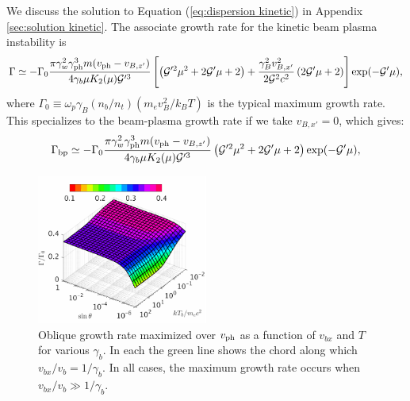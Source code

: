 \documentclass[usenatbib,iop,apj]{emulateapj}
\def\gph{\gamma_{\rm ph}}
\def\vph{v_{\rm ph}}
\def\cG{\mathcal{G}}
\begin{document}
We discuss the solution to Equation (\ref{eq:dispersion kinetic}) in Appendix \ref{sec:solution kinetic}.  The associate growth rate for the kinetic beam plasma instability is  
\begin{equation}
\Gamma \simeq - \Gamma_0
\frac{\pi \gamma_w^2 \gph^3 m (\vph-v_{B,z'})}{4 \gamma_b \mu K_2(\mu) \cG'^3}
\left[
\left( \cG'^2\mu^2 + 2\cG'\mu + 2 \right) 
+
\frac{\gamma_B^2 v_{B,x'}^2}{2\cG^2c^2} \left(2 \cG'\mu+ 2\right)
\right]
\exp(-\cG'\mu),\label{eq:kinetic growth rate}
\end{equation}
where $\Gamma_0 \equiv \omega_p \gamma_B (n_b/n_t) (m_e v_B^2/k_B T)$ is the typical maximum growth rate.  This specializes to the beam-plasma growth rate if we take $v_{B,x'} = 0$, which gives:
\begin{equation}
\Gamma_{\rm bp} \simeq - \Gamma_0
\frac{\pi \gamma_w^2 \gph^3 m (\vph-v_{B,z'})}{4 \gamma_b \mu K_2(\mu) \cG'^3}
\left( \cG'^2\mu^2 + 2\cG'\mu + 2 \right) 
\exp(-\cG'\mu),\label{eq:bp kinetic growth rate}
\end{equation}


\begin{figure}
\includegraphics[width=0.5\textwidth]{pp1.pdf}
\caption{Oblique growth rate maximized over $\vph$ as a function of
  $v_{bx}$ and $T$ for various $\gamma_b$.  In each the green line
  shows the chord along which $v_{bx}/v_b = 1/\gamma_b$.  In all
  cases, the maximum growth rate occurs when
  $v_{bx}/v_b\gg1/\gamma_b$.}\label{fig:ObliqueGMZ}
\end{figure}
\end{document}
